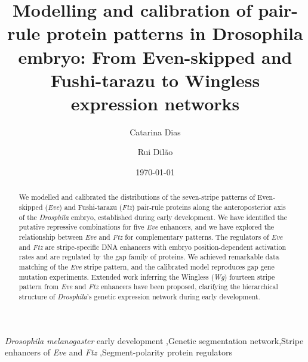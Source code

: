\documentclass[final,authoryear, 5p, times]{elsarticle}
\begin{document}
\begin{frontmatter}



\title{Modelling and calibration of pair-rule protein patterns in Drosophila embryo: From Even-skipped and Fushi-tarazu
 to Wingless expression networks}


\author{Catarina Dias}

\author{Rui Dil\~ao}
\address{University of Lisbon, IST, Dep. of Physics, Nonlinear Dynamics Group, 
Av. Rovisco Pais, 1049-001 Lisbon, Portugal}

\date{\today}

\begin{abstract}
We modelled and calibrated the distributions of the seven-stripe patterns of Even-skipped (\textit{Eve})  and Fushi-tarazu (\textit{Ftz}) pair-rule proteins along the anteroposterior axis of the \textit{Drosphila} embryo, established during early development. We have identified the putative repressive combinations for five \textit{Eve} enhancers, and we have explored the relationship between \textit{Eve} and  \textit{Ftz} for complementary patterns. The regulators of \textit{Eve} and \textit{Ftz} are stripe-specific DNA enhancers with embryo position-dependent activation rates and are regulated by the gap family of proteins.  We achieved remarkable data matching of the \textit{Eve} stripe pattern, and the calibrated model reproduces gap gene mutation experiments.  Extended work inferring the Wingless (\textit{Wg}) fourteen stripe pattern from \textit{Eve} and \textit{Ftz} enhancers have been proposed,  clarifying the hierarchical structure of \textit{Drosphila}'s genetic expression network during early development.
\end{abstract}


\begin{keyword} \textit{Drosophila melanogaster} early development \sep Genetic segmentation network\sep Stripe enhancers of \textit{Eve} and \textit{Ftz} \sep Segment-polarity protein regulators
\end{keyword}

\end{frontmatter}
\end{document}
